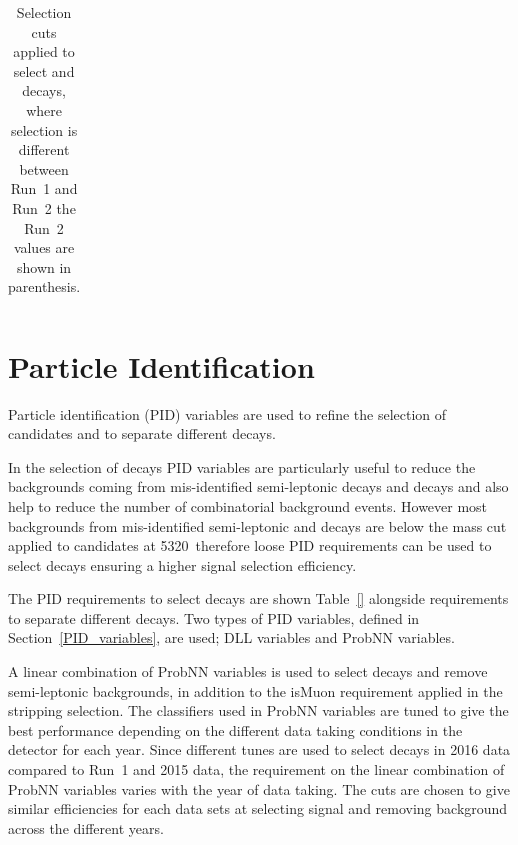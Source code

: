 \begin{table}[htbp]
\begin{center}
\begin{tabular}{lll}
\hline

\hline
\end{tabular}
\vspace{0.7cm}
\caption{Selection cuts applied to select \bsmumu and \bhh decays, where selection is different between Run~1 and Run~2 the Run~2 values are shown in parenthesis.}
\label{tab:fullpreselection}
\end{center}
\end{table}



\section{Particle Identification}
\label{sec:PID}
Particle identification (PID) variables are used to refine the selection of \bsmumu candidates and to separate different \bhh decays. 

In the selection of \bsmumu decays PID variables are particularly useful to reduce the backgrounds coming from mis-identified semi-leptonic decays and \bhh decays and also help to reduce the number of combinatorial background events. However most backgrounds from mis-identified semi-leptonic and \bhh decays are below the mass cut applied to \bsmumu candidates at 5320~\mevcc therefore loose PID requirements can be used to select \bsmumu decays ensuring a higher signal selection efficiency.

The PID requirements to select \bmumu decays are shown Table~\ref{} alongside requirements to separate different \bhh decays. Two types of PID variables, defined in Section~\ref{PID_variables}, are used; DLL variables and ProbNN variables. 

A linear combination of ProbNN variables is used to select \bsmumu decays and remove semi-leptonic backgrounds, in addition to the isMuon requirement applied in the stripping selection.
The classifiers used in ProbNN variables are tuned to give the best performance depending on the different data taking conditions in the detector for each year. %
Since different tunes are used to select \bsmumu decays in 2016 data compared to Run~1 and 2015 data, the requirement on the linear combination of ProbNN variables varies with the year of data taking. The cuts are chosen to give similar efficiencies for each data sets at selecting signal and removing background across the different years. 



